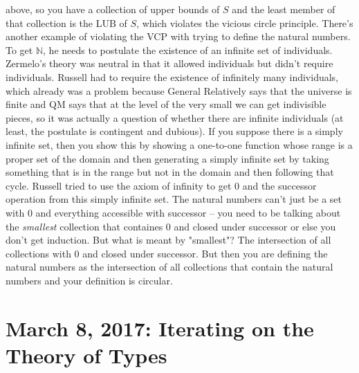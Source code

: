 \documentclass[12pt]{article}
\theoremstyle{definition}
\begin{document}
\begin{itemize}
        above, so you have a collection of upper bounds of $S$ and the least
        member of that collection is the LUB of $S$, which violates the vicious
        circle principle. There's another example of violating the VCP with
        trying to define the natural numbers. To get $\mathbb{N}$, he needs to
        postulate the existence of an infinite set of individuals. Zermelo's
        theory was neutral in that it allowed individuals but didn't require
        individuals. Russell had to require the existence of infinitely many
        individuals, which already was a problem because General Relatively
        says that the universe is finite and QM says that at the level of the
        very small we can get indivisible pieces, so it was actually a question
        of whether there are infinite individuals (at least, the postulate is
        contingent and dubious). If you suppose there is a simply infinite set,
        then you show this by showing a one-to-one function whose range is a
        proper set of the domain and then generating a simply infinite set by
        taking something that is in the range but not in the domain and then
        following that cycle. Russell tried to use the axiom of infinity to get
        0 and the successor operation from this simply infinite set. The
        natural numbers can't just be a set with 0 and everything accessible
        with successor -- you need to be talking about the \textit{smallest}
        collection that containes 0 and closed under successor or else you
        don't get induction. But what is meant by "smallest"? The intersection
        of all collections with 0 and closed under successor. But then you are
        defining the natural numbers as the intersection of all collections
        that contain the natural numbers and your definition is circular. 
\end{itemize}

\section{March 8, 2017: Iterating on the Theory of Types}
\end{document}
